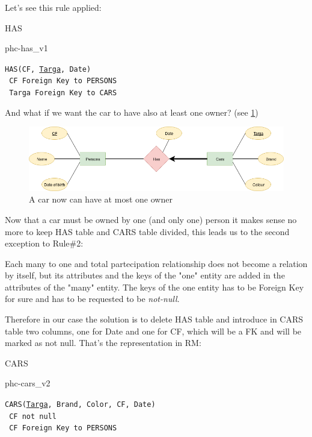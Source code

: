 \documentclass[class=book, crop=false, oneside]{standalone}
\newcommand\tab[1][1cm]{\hspace*{#1}}
\begin{document}
Let's see this rule applied:
\vskip 20pt
\begin{minipage}{.8\textwidth}
	HAS
	\begin{table}[H]
		{phc-has_v1}
	\end{table}
	\texttt{HAS(CF, \underline{Targa}, Date)}\\
	\tab[.4cm] \texttt{	CF Foreign Key to PERSONS}\\
	\tab[.4cm] \texttt{	Targa Foreign Key to CARS}
\end{minipage}
\vskip 20pt
And what if we want the car to have also at least one owner? (see \ref{diagram1_02})
\begin{figure}[H]
	\centering
	\includegraphics[width=\textwidth,keepaspectratio]{diagram1_02.png}
	\caption{A car now can have at most one owner}
	\label{diagram1_02}
\end{figure}
Now that a car must be owned by one (and only one) person it makes sense no more to keep HAS table and CARS table divided, this leads us to the second exception to Rule\#2:

Each many to one and total partecipation relationship does not become a relation by itself, but its attributes and the keys of the "one" entity are added in the attributes of the "many" entity. The keys of the one entity has to be Foreign Key for sure and has to be requested to be \emph{not-null}.

Therefore in our case the solution is to delete HAS table and introduce in CARS table two columns, one for Date and one for CF, which will be a FK and will be marked as not null.
That's the representation in RM:
\vskip 20pt
\begin{minipage}{.8\textwidth}
	CARS
	\begin{table}[H]
		{phc-cars_v2}
	\end{table}
	\texttt{CARS(\underline{Targa}, Brand, Color, CF, Date)}\\
	\tab[.4cm] \texttt{	CF not null}\\
	\tab[.4cm] \texttt{	CF Foreign Key to PERSONS}
\end{minipage}
\vskip 20pt
\end{document}
